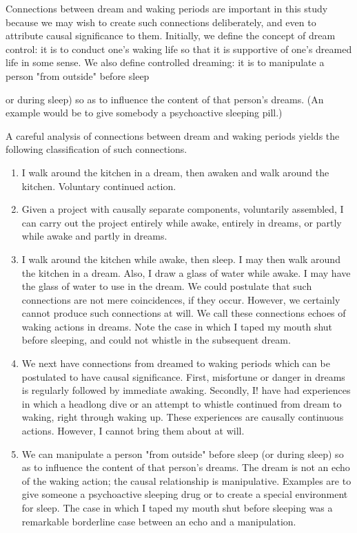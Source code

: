 \documentclass[10pt,twoside,draft]{memoir}
\begin{document}
{{Connections between dream and waking periods are important in this 
study because we may wish to create such connections deliberately, and even 
to attribute causal significance to them. Initially, we define the concept of 
dream control: it is to conduct one's waking life so that it is supportive of 
one's dreamed life in some sense. We also define controlled dreaming: it is to 
manipulate a person "from outside" before sleep {or during sleep) so as to 
influence the content of that person's dreams. (An example would be to give 
somebody a psychoactive sleeping pill.) 

A careful analysis of connections between dream and waking periods 
yields the following classification of such connections. 

\begin{enumerate}
	\item I walk around the kitchen in a dream, then awaken and walk around the 
kitchen. Voluntary continued action. 

\item Given a project with causally separate components, voluntarily 
assembled, I can carry out the project entirely while awake, entirely in 
dreams, or partly while awake and partly in dreams. 

\item I walk around the kitchen while awake, then sleep. I may then walk 
around the kitchen in a dream. Also, I draw a glass of water while awake. I 
may have the glass of water to use in the dream. We could postulate that 
such connections are not mere coincidences, if they occur. However, we 
certainly cannot produce such connections at will. We call these connections 
echoes of waking actions in dreams. Note the case in which I taped my 
mouth shut before sleeping, and could not whistle in the subsequent dream. 

\item We next have connections from dreamed to waking periods which can be 
postulated to have causal significance. First, misfortune or danger in dreams 
is regularly followed by immediate awaking. Secondly, I! have had 
experiences in which a headlong dive or an attempt to whistle continued 
from dream to waking, right through waking up. These experiences are 
causally continuous actions. However, I cannot bring them about at will. 

\item We can manipulate a person "from outside" before sleep (or during sleep) 
so as to influence the content of that person's dreams. The dream is not an 
echo of the waking action; the causal relationship is manipulative. Examples 
are to give someone a psychoactive sleeping drug or to create a special 
environment for sleep. The case in which I taped my mouth shut before 
sleeping was a remarkable borderline case between an echo and a 
manipulation. 
\end{enumerate}

}}}
\end{document}
